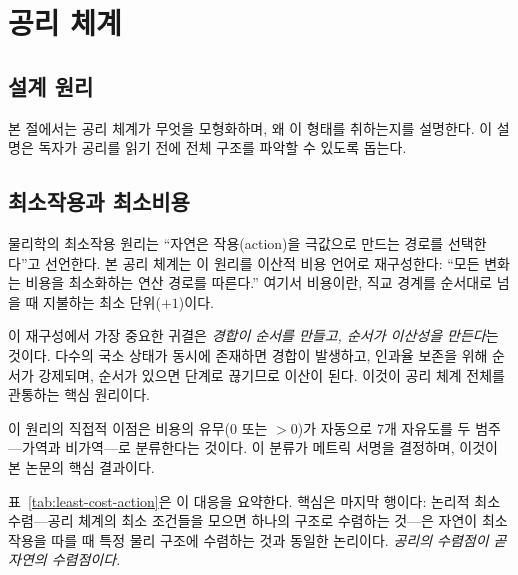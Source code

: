 \documentclass[entropy,article,submit,pdftex,oneauthor]{Definitions/mdpi}
\begin{document}
\section{공리 체계}
\label{sec:axioms}

\subsection{설계 원리}
\label{sec:framework}

본 절에서는 공리 체계가 무엇을 모형화하며, 왜 이 형태를 취하는지를 설명한다. 이 설명은 독자가 공리를 읽기 전에 전체 구조를 파악할 수 있도록 돕는다.

\subsection{최소작용과 최소비용}

물리학의 최소작용 원리는 ``자연은 작용(action)을 극값으로 만드는 경로를 선택한다''고 선언한다. 본 공리 체계는 이 원리를 이산적 비용 언어로 재구성한다: ``모든 변화는 비용을 최소화하는 연산 경로를 따른다.'' 여기서 비용이란, 직교 경계를 순서대로 넘을 때 지불하는 최소 단위($+1$)이다.

이 재구성에서 가장 중요한 귀결은 \emph{경합이 순서를 만들고, 순서가 이산성을 만든다}는 것이다. 다수의 국소 상태가 동시에 존재하면 경합이 발생하고, 인과율 보존을 위해 순서가 강제되며, 순서가 있으면 단계로 끊기므로 이산이 된다. 이것이 공리 체계 전체를 관통하는 핵심 원리이다.

이 원리의 직접적 이점은 비용의 유무($0$ 또는 $>0$)가 자동으로 7개 자유도를 두 범주---가역과 비가역---로 분류한다는 것이다. 이 분류가 메트릭 서명을 결정하며, 이것이 본 논문의 핵심 결과이다.

표~\ref{tab:least-cost-action}은 이 대응을 요약한다. 핵심은 마지막 행이다: 논리적 최소 수렴---공리 체계의 최소 조건들을 모으면 하나의 구조로 수렴하는 것---은 자연이 최소 작용을 따를 때 특정 물리 구조에 수렴하는 것과 동일한 논리이다. \emph{공리의 수렴점이 곧 자연의 수렴점이다.}
\end{document}
